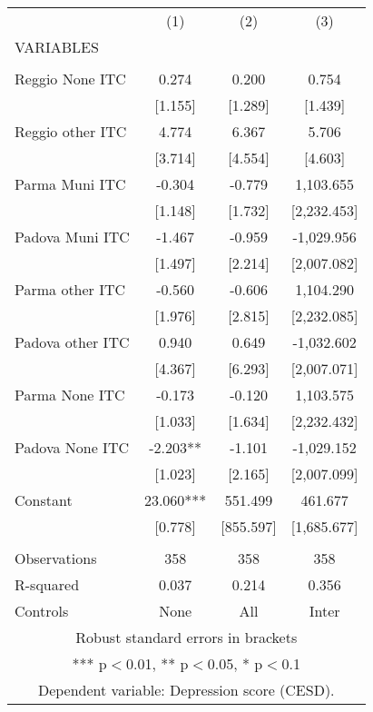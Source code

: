 \begin{tabular}{lccc} \hline
 & (1) & (2) & (3) \\
VARIABLES &  &  &  \\ \hline
 &  &  &  \\
Reggio None ITC & 0.274 & 0.200 & 0.754 \\
 & [1.155] & [1.289] & [1.439] \\
Reggio other ITC & 4.774 & 6.367 & 5.706 \\
 & [3.714] & [4.554] & [4.603] \\
Parma Muni ITC & -0.304 & -0.779 & 1,103.655 \\
 & [1.148] & [1.732] & [2,232.453] \\
Padova Muni ITC & -1.467 & -0.959 & -1,029.956 \\
 & [1.497] & [2.214] & [2,007.082] \\
Parma other ITC & -0.560 & -0.606 & 1,104.290 \\
 & [1.976] & [2.815] & [2,232.085] \\
Padova other ITC & 0.940 & 0.649 & -1,032.602 \\
 & [4.367] & [6.293] & [2,007.071] \\
Parma None ITC & -0.173 & -0.120 & 1,103.575 \\
 & [1.033] & [1.634] & [2,232.432] \\
Padova None ITC & -2.203** & -1.101 & -1,029.152 \\
 & [1.023] & [2.165] & [2,007.099] \\
Constant & 23.060*** & 551.499 & 461.677 \\
 & [0.778] & [855.597] & [1,685.677] \\
 &  &  &  \\
Observations & 358 & 358 & 358 \\
R-squared & 0.037 & 0.214 & 0.356 \\
 Controls & None & All & Inter \\ \hline
\multicolumn{4}{c}{ Robust standard errors in brackets} \\
\multicolumn{4}{c}{ *** p$<$0.01, ** p$<$0.05, * p$<$0.1} \\
\multicolumn{4}{c}{ Dependent variable: Depression score (CESD).} \\
\end{tabular}
